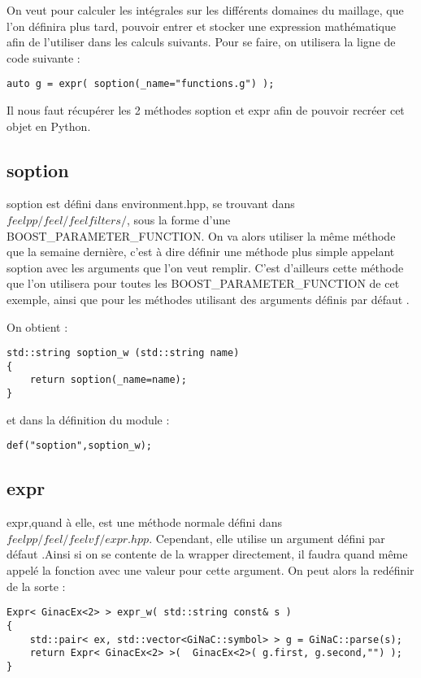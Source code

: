 \documentclass[12pt]{article}
\begin{document}
On veut pour calculer les intégrales sur les différents domaines du maillage, que l'on définira plus tard, pouvoir entrer et stocker une expression mathématique afin de l'utiliser dans les calculs suivants.
Pour se faire, on utilisera la ligne de code suivante :

\begin{verbatim}
auto g = expr( soption(_name="functions.g") );
\end{verbatim}

Il nous faut récupérer les 2 méthodes soption et expr afin de pouvoir recréer cet objet en Python.

\subsection{soption}

soption est défini dans environment.hpp, se trouvant dans $feelpp/feel/feelfilters/$, sous la forme d'une BOOST\_PARAMETER\_FUNCTION. On va alors utiliser la même méthode que la semaine dernière, c'est à dire définir une méthode plus simple appelant soption avec les arguments que l'on veut remplir.
C'est d'ailleurs cette méthode que l'on utilisera pour toutes les BOOST\_PARAMETER\_FUNCTION de cet exemple, ainsi que pour les méthodes utilisant des arguments définis par défaut .

On obtient :
\begin{lstlisting}
std::string soption_w (std::string name)
{
    return soption(_name=name);
}
\end{lstlisting}

et dans la définition du module :

\begin{lstlisting}
def("soption",soption_w);
\end{lstlisting}

\subsection{expr}

expr,quand à elle, est une méthode normale défini dans $feelpp/feel/feelvf/expr.hpp$.
Cependant, elle utilise un argument défini par défaut .Ainsi si on se contente de la wrapper directement, il faudra quand même appelé la fonction avec une valeur pour cette argument.
On peut alors la redéfinir de la sorte :

\begin{lstlisting}
Expr< GinacEx<2> > expr_w( std::string const& s )
{
    std::pair< ex, std::vector<GiNaC::symbol> > g = GiNaC::parse(s);
    return Expr< GinacEx<2> >(  GinacEx<2>( g.first, g.second,"") );
}
\end{lstlisting}
\end{document}
